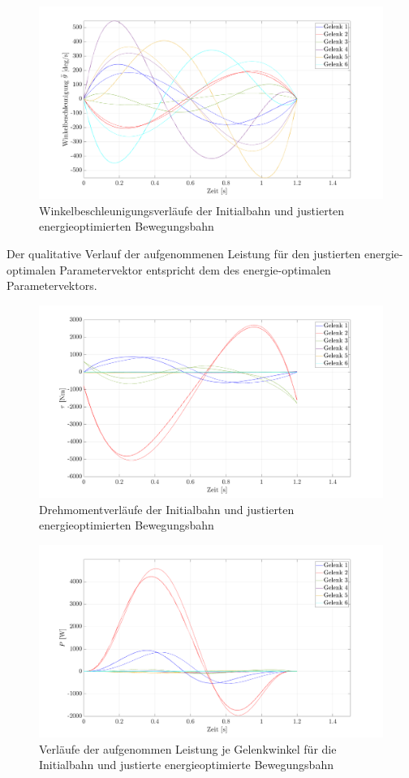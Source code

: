 %
\begin{figure}[tbph]
	\centering
	\includegraphics[width=1\linewidth]{images/Optimierungsergebnisse_up/accoptfinal}
	\caption{Winkelbeschleunigungsverläufe der Initialbahn und justierten energieoptimierten Bewegungsbahn}
	\label{fig:accoptfinal}
\end{figure}
%
Der qualitative Verlauf der aufgenommenen Leistung für den justierten energie-optimalen Parametervektor entspricht dem des energie-optimalen Parametervektors. 
%
\begin{figure}[tbph]
	\centering
	\includegraphics[width=1\linewidth]{images/Optimierungsergebnisse_up/tauoptfinal}
	\caption{Drehmomentverläufe der Initialbahn und justierten energieoptimierten Bewegungsbahn}
	\label{fig:tauoptfinal}
\end{figure}
%
\begin{figure}[tbph]
	\centering
	\includegraphics[width=1\linewidth]{images/Optimierungsergebnisse_up/poptfinal}
	\caption{Verläufe der aufgenommen Leistung je Gelenkwinkel für die Initialbahn und justierte energieoptimierte Bewegungsbahn}
	\label{fig:poptfinal}
\end{figure}

